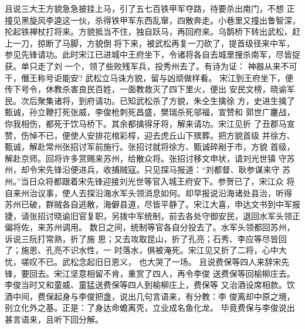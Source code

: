 且说三大王方貌急急披挂上马，引了五七百铁甲军夺路，待要杀出南门，不想
正撞见黑旋风李逵这一伙，杀得铁甲军东西乱窜，四散奔走。小巷里又撞出鲁智深，
抡起铁禅杖打将来。方貌抵当不住，独自跃马，再回府来。乌鹊桥下转出武松，赶
上一刀，掠断了马脚，方貌倒将下来，被武松再复一刀砍了，提首级径来中军，
参见先锋请功。此时宋江已进城中王府坐下，令诸将各自去城里搜杀南军，尽皆捉
获。单只走了刘一个，领了些败残军兵，投秀州去了。有诗为证：
神器从来不可干，僭王称号讵能安?
武松立马诛方貌，留与凶顽做样看。
宋江到王府坐下，便传下号令，休教杀害良民百姓，一面教救灭了四下里火，便出
安民文榜，晓谕军民。次后聚集诸将，到府请功。已知武松杀了方貌，朱仝生擒徐
方，史进生擒了甄诚，孙立鞭打死张威，李俊枪刺死昌盛，樊瑞杀死邬福，宣赞和
郭世广鏖战，你我相伤，都死于饮马桥下。其余都擒得牙将，解来请功。宋江见折
了丑郡马宣赞，伤悼不已，便使人安排花棺彩椁，迎去虎丘山下殡葬。把方貌首级
并徐方、甄诚，解赴常州张招讨军前施行。张招讨就将徐方、甄诚碎剐于市，方貌
首级，解赴京师。回将许多赏赐来苏州，给散众将。张招讨移文申状，请刘光世镇
守苏州，却令宋先锋沿便进兵，收捕贼寇。只见探马报道：“刘都督、耿参谋来守
苏州。”当日众将都跟着宋先锋迎接刘光世等官入城王府安下。参贺已了，宋江众
将自来州治议事，使人去探沿海水军头领消息如何。却早报说沿海诸处县治，听得
苏州已破，群贼各自逃散，海僻县道，尽皆平静了。宋江大喜，申达文书到中军报
捷，请张招讨晓谕旧官复职，另拨中军统制，前去各处守御安民，退回水军头领正
偏将佐，来苏州调用。
数日之间，统制等官各自分投去了。水军头领都回苏州，诉说三阮打常熟，折了施
恩；又去攻取昆山，折了孔亮；石秀、李应等尽皆回了；施恩、孔亮不识水性，一
时落水，俱被淹死。宋江见又折了二将，心中大忧，嗟叹不已。武松念起旧日恩义，
也大哭了一场。
且说费保等四人来辞宋先锋，要回去。宋江坚意相留不肯，重赏了四人，再令李俊
送费保等回榆柳庄去。李俊当时又和童威、童猛送费保等四人到榆柳庄上，费保等
又治酒设席相款。饮酒中间，费保起身与李俊把盏，说出几句言语来，有分教：李
俊离却中原之境，别立化外之基。正是：了身达命蟾离壳，立业成名鱼化龙。
毕竟费保与李俊说出甚言语来，且听下回分解。